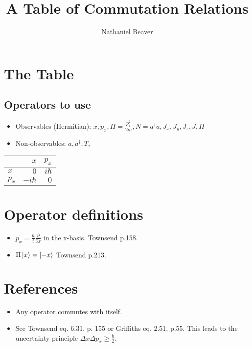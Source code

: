 \documentclass[12pt,letterpaper]{article}
\author{Nathaniel Beaver}
\title{A Table of Commutation Relations}
\begin{document}
\maketitle

\section{The Table}

\subsection{Operators to use}

\begin{itemize}
\item Observables (Hermitian): $x, p_x, H=\frac{p_x^2}{2m}, N=a^\dagger a, J_x, J_y, J_z, J, \hyperref[def_Pi]{\Pi}$
\item Non-observables: $a, a^\dagger, T, $
\end{itemize}


\begin{tabular}{ l | r r }
            & $x$ & $p_x$ \\
\hline
  $x$ & \hyperref[self]{$0$} & \hyperref[unc]{$i \hbar$}\\
  \hyperref[def_p_x]{$p_x$} & $-i\hbar$ & $0$ \\
\end{tabular}

\newpage

\section{Operator definitions}
\begin{itemize}
\item \label{def_p_x} $p_x = \frac{\hbar}{i}\frac{\partial}{\partial x}$ in the x-basis. Townsend p.158.
\item \label{def_Pi} $\Pi\ket{x}=\ket{-x}$ Townsend p.213.
\end{itemize}

\section{References}
\begin{itemize}
\item \label{self} Any operator commutes with itself.
\item \label{unc} See Townsend eq. 6.31, p. 155 or Griffiths eq. 2.51, p.55. This leads to the uncertainty principle $\Delta x \Delta p_x \geq \frac{\hbar}{2}$.
\end{itemize}
\end{document}
